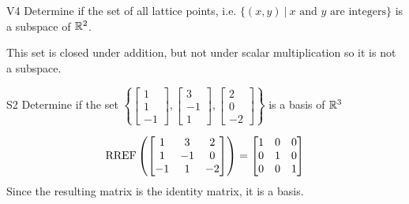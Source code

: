 \documentclass{sbgLAquiz}
\begin{document}
\begin{problem}{V4}
Determine if the set of all lattice points, i.e. $\{(x,y)\ \big|\ \text{$x$ and $y$ are integers} \}$ is a subspace of $\mathbb{R}^2$.
\end{problem}
\begin{solution}
This set is closed under addition, but not under scalar multiplication so it is not a subspace.
\end{solution}

\begin{extract}\newpage\end{extract}
\begin{problem}{S2}
Determine if the set $\left\{\begin{bmatrix} 1 \\ 1 \\ -1 \end{bmatrix}, \begin{bmatrix} 3 \\ -1 \\ 1 \end{bmatrix},\begin{bmatrix} 2 \\ 0 \\ -2 \end{bmatrix}\right\}$ is a basis of $\mathbb{R}^3$
\end{problem}
\begin{solution}
$$\operatorname{RREF}\left(\begin{bmatrix} 1 & 3 & 2 \\ 1 & -1 & 0 \\ -1 & 1 & -2 \end{bmatrix} \right)= \begin{bmatrix} 1 & 0 &0 \\ 0 & 1 & 0 \\ 0 & 0 & 1\end{bmatrix}$$
Since the resulting matrix is the identity matrix, it is a basis.
\end{solution}
\end{document}
